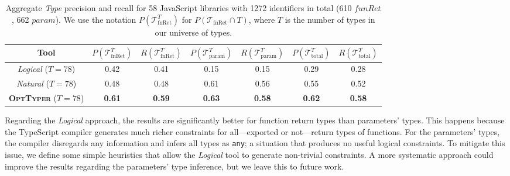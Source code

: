 \documentclass[sigplan,10pt,review,anonymous]{acmart} %
\newcommand{\projectname}{\textsc{OptTyper}\xspace}
\theoremstyle{plain}
\theoremstyle{remark}
\theoremstyle{definition}
\begin{document}
\begin{table*}[t]
	\centering
	\caption{Aggregate \textit{Type} precision and recall for 58 JavaScript libraries with 1272 identifiers in total (610 $funRet$, 662 $param$).
		We use the notation $P(\mathcal{T}^T_\text{fnRet})$ for $P(\mathcal{T}_\text{fnRet} \cap T)$, where $T$ is the number of types in our universe of types.}\label{tab:typeprec1}
	\begin{tabular}{ccccccc}
		\toprule
		Tool                                  & $P(\mathcal{T}^T_\text{fnRet})$ & $R(\mathcal{T}^T_\text{fnRet})$ & $P(\mathcal{T}^T_\text{param})$ & $R(\mathcal{T}^T_\text{param})$ & $P(\mathcal{T}^T_\text{total})$ & $R(\mathcal{T}^T_\text{total})$ \\
		\midrule

		\textit{Logical} \tiny{($T=78$)}      & 0.42                  & 0.41                  & 0.15                  & 0.15                  & 0.29                  & 0.28                  \\
		\textit{Natural} \tiny{($T=78$)}      & 0.48                  & 0.48                  & 0.61                  & 0.56                  & 0.55                  & 0.52                  \\
		\textbf{\projectname} \tiny{($T=78$)} & \textbf{0.61}         & \textbf{0.59}         & \textbf{0.63}         & \textbf{0.58}
		                                      & \textbf{0.62}         & \textbf{0.58}                                                                                                         \\
		\bottomrule
	\end{tabular}
\end{table*}
Regarding the \textit{Logical} approach, the results are significantly better for function return types
than parameters' types.
This happens because the TypeScript compiler generates much richer constraints for all---exported or not---return
types of functions.
For the parameters' types, the compiler disregards any information
and infers all types as \texttt{any}; a situation that produces no useful logical constraints.
To mitigate this issue, we define some simple heuristics that allow the \textit{Logical} tool
to generate non-trivial constraints.
A more systematic approach could improve the results regarding the parameters' type inference,
but we leave this to future work.
\end{document}
